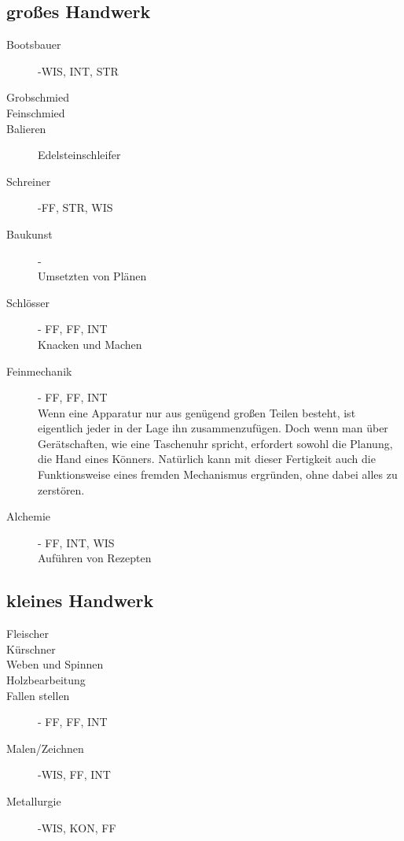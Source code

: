 \documentclass[a4paper,12pt,oneside]{book}
\begin{document}
\subsection{großes Handwerk}
\begin{description}
\item[Bootsbauer]-WIS, INT, STR
\item[Grobschmied]
\item[Feinschmied]
\item[Balieren]Edelsteinschleifer
\item[Schreiner]-FF, STR, WIS
\item[Baukunst]-
\\Umsetzten von Plänen
\item[Schlösser]- FF, FF, INT
\\Knacken und Machen
\item[Feinmechanik]- FF, FF, INT
\\Wenn eine Apparatur nur aus genügend großen Teilen besteht, ist eigentlich jeder in der Lage ihn zusammenzufügen. Doch wenn man über Gerätschaften, wie eine Taschenuhr spricht, erfordert sowohl die Planung, die Hand eines Könners. Natürlich kann mit dieser Fertigkeit auch die Funktionsweise eines fremden Mechanismus ergründen, ohne dabei alles zu zerstören.
\item[Alchemie]- FF, INT, WIS
\\Auführen von Rezepten
\end{description}
\subsection{kleines Handwerk}
\begin{description}
\item[Fleischer]
\item[Kürschner]
\item[Weben und Spinnen]
\item[Holzbearbeitung]
\item[Fallen stellen]- FF, FF, INT
\item[Malen/Zeichnen]-WIS, FF, INT
\item[Metallurgie]-WIS, KON, FF
\end{description}
\end{document}
